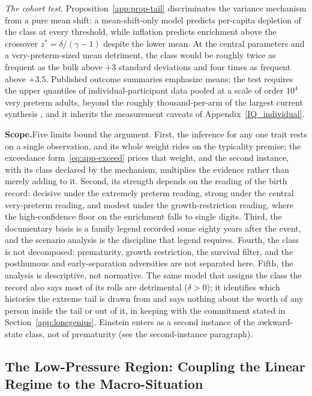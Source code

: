 \documentclass{article}
\begin{document}
\emph{The cohort test.} Proposition~\ref{app:prop-tail} discriminates the variance mechanism from a pure mean shift: a mean-shift-only model predicts per-capita depletion of the class at every threshold, while inflation predicts enrichment above the crossover $z^{\ast} = \delta/(\gamma-1)$ despite the lower mean. At the central parameters and a very-preterm-sized mean detriment, the class would be roughly twice as frequent as the bulk above $+3$ standard deviations and four times as frequent above $+3.5$. Published outcome summaries emphasize means; the test requires the upper quantiles of individual-participant data pooled at a scale of order $10^{4}$ very preterm adults, beyond the roughly thousand-per-arm of the largest current synthesis \cite{eves2021association}, and it inherits the measurement caveats of Appendix~\ref{IQ_individual}.


\par\medskip\noindent\textbf{Scope.}\enspace Five limits bound the argument. First, the inference for any one trait rests on a single observation, and its whole weight rides on the typicality premise; the exceedance form~\eqref{eq:app-exceed} prices that weight, and the second instance, with its class declared by the mechanism, multiplies the evidence rather than merely adding to it. Second, its strength depends on the reading of the birth record: decisive under the extremely preterm reading, strong under the central very-preterm reading, and modest under the growth-restriction reading, where the high-confidence floor on the enrichment falls to single digits. Third, the documentary basis is a family legend recorded some eighty years after the event, and the scenario analysis is the discipline that legend requires. Fourth, the class is not decomposed: prematurity, growth restriction, the survival filter, and the posthumous and early-separation adversities are not separated here. Fifth, the analysis is descriptive, not normative. The same model that assigns the class the record also says most of its rolls are detrimental ($\delta > 0$); it identifies which histories the extreme tail is drawn from and says nothing about the worth of any person inside the tail or out of it, in keeping with the commitment stated in Section~\ref{app:lonegenius}. Einstein enters as a second instance of the awkward-state class, not of prematurity (see the second-instance paragraph).

\subsection{The Low-Pressure Region: Coupling the Linear Regime to the Macro-Situation}\label{app:lowpressure}
\end{document}
